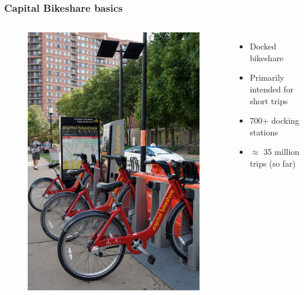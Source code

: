 \documentclass{beamer}
\begin{document}
\begin{frame}
    \frametitle{Capital Bikeshare basics}
    \begin{columns}
        \begin{figure}
            \includegraphics[]{800px-VA_07_2012_Capital_Bikeshare_4152.JPG}
        \end{figure}
        \begin{itemize}
            \item Docked bikeshare
            \item Primarily intended for short trips
            \item 700+ docking stations
            \item $\approx$ 35 million trips (so far)
        \end{itemize}


\end{columns}
\end{frame}
\end{document}
